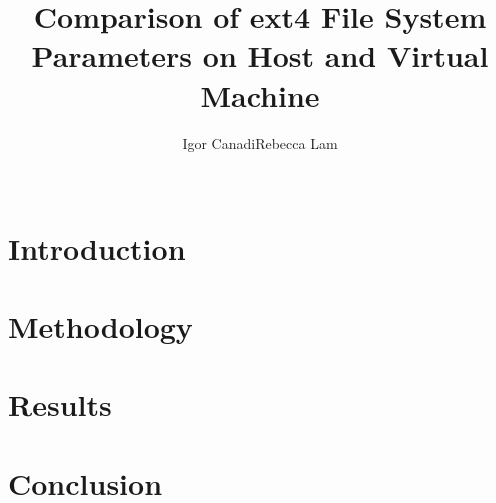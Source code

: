 \documentclass{sig-alternate}
\begin{document}
\title{Comparison of ext4 File System Parameters on Host and Virtual Machine}

\author{
	\alignauthor Igor Canadi\qquad Rebecca Lam\\
	\\
}

\maketitle



\section{Introduction}
\label{sec:intro}


\section{Methodology}
\label{sec:method}


\section{Results}
\label{sec:results}


\section{Conclusion}
\label{sec:conc}

\end{document}
